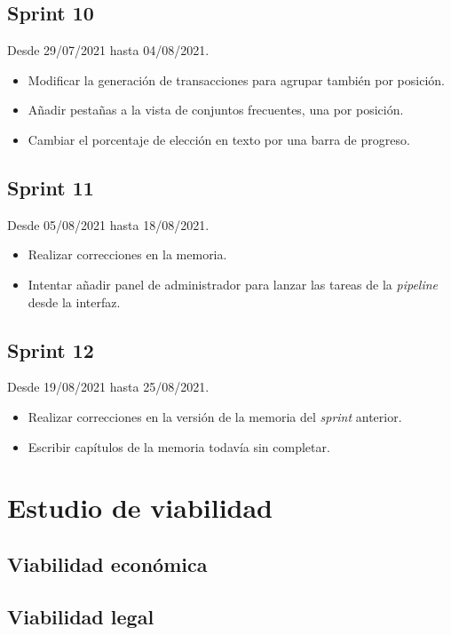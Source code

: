 \subsection{Sprint 10}

Desde 29/07/2021 hasta 04/08/2021.

\begin{itemize}
	\item Modificar la generación de transacciones para agrupar también por posición.
	\item Añadir pestañas a la vista de conjuntos frecuentes, una por posición.
	\item Cambiar el porcentaje de elección en texto por una barra de progreso.
\end{itemize}

\subsection{Sprint 11}

Desde 05/08/2021 hasta 18/08/2021.

\begin{itemize}
	\item Realizar correcciones en la memoria.
	\item Intentar añadir panel de administrador para lanzar las tareas de la \textit{pipeline} desde la interfaz.
\end{itemize}

\subsection{Sprint 12}

Desde 19/08/2021 hasta 25/08/2021.

\begin{itemize}
	\item Realizar correcciones en la versión de la memoria del \textit{sprint} anterior.
	\item Escribir capítulos de la memoria todavía sin completar.
\end{itemize}

\section{Estudio de viabilidad}

\subsection{Viabilidad económica}

\subsection{Viabilidad legal}


